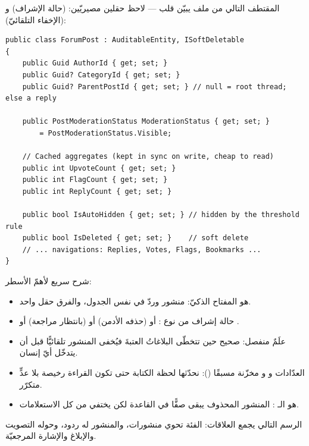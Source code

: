 المقتطف التالي من ملف  يبيّن قلب  — لاحظ حقلين مصيريّين:
 (حالة الإشراف) و (الإخفاء التلقائيّ):

\begin{english}
\begin{lstlisting}[language={[Sharp]C}]
public class ForumPost : AuditableEntity, ISoftDeletable
{
    public Guid AuthorId { get; set; }
    public Guid? CategoryId { get; set; }
    public Guid? ParentPostId { get; set; } // null = root thread; else a reply

    public PostModerationStatus ModerationStatus { get; set; }
        = PostModerationStatus.Visible;

    // Cached aggregates (kept in sync on write, cheap to read)
    public int UpvoteCount { get; set; }
    public int FlagCount { get; set; }
    public int ReplyCount { get; set; }

    public bool IsAutoHidden { get; set; } // hidden by the threshold rule
    public bool IsDeleted { get; set; }    // soft delete
    // ... navigations: Replies, Votes, Flags, Bookmarks ...
}
\end{lstlisting}
\end{english}

شرح سريع لأهمّ الأسطر:
\begin{itemize}
\item {} هو المفتاح الذكيّ: منشور وردّ في نفس الجدول، والفرق حقل واحد.
\item {} حالة إشراف من نوع : 
  أو  (حذفه الأدمن) أو  (بانتظار مراجعة) أو .
\item {} علَمٌ منفصل: صحيح حين تتخطّى البلاغاتُ العتبةَ فيُخفى المنشور
  تلقائيًّا قبل أن يتدخّل أيّ إنسان.
\item العدّادات  و و مخزّنة مسبقًا
  (): نحدّثها لحظة الكتابة حتى تكون القراءة رخيصة بلا عدٍّ متكرّر.
\item {} هو الـ : المنشور المحذوف يبقى صفًّا في القاعدة لكن
  يختفي من كل الاستعلامات.
\end{itemize}

الرسم التالي يجمع العلاقات: الفئة تحوي منشورات، والمنشور له ردود، وحوله التصويت والإبلاغ
والإشارة المرجعيّة.

